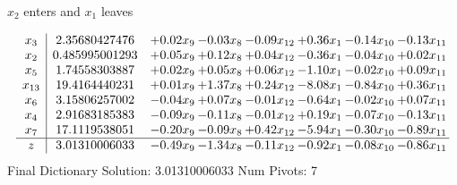 \documentclass[9pt]{article}
\begin{document}
 $ x_{2} $ enters and $ x_{1} $ leaves 

 \[\begin{array}{c| c c@{\hskip 2pt} c@{\hskip 2pt} c@{\hskip 2pt} c@{\hskip 2pt} c@{\hskip 2pt} c@{\hskip 2pt} }
 x_{3}   &  2.35680427476 & +  0.02 x_{9} & -0.03 x_{8} & -0.09 x_{12} & +  0.36 x_{1} & -0.14 x_{10} & -0.13 x_{11}\\
 x_{2}   &  0.485995001293 & +  0.05 x_{9} & +  0.12 x_{8} & +  0.04 x_{12} & -0.36 x_{1} & -0.04 x_{10} & +  0.02 x_{11}\\
 x_{5}   &  1.74558303887 & +  0.02 x_{9} & +  0.05 x_{8} & +  0.06 x_{12} & -1.10 x_{1} & -0.02 x_{10} & +  0.09 x_{11}\\
 x_{13}   &  19.4164440231 & +  0.01 x_{9} & +  1.37 x_{8} & +  0.24 x_{12} & -8.08 x_{1} & -0.84 x_{10} & +  0.36 x_{11}\\
 x_{6}   &  3.15806257002 & -0.04 x_{9} & +  0.07 x_{8} & -0.01 x_{12} & -0.64 x_{1} & -0.02 x_{10} & +  0.07 x_{11}\\
 x_{4}   &  2.91683185383 & -0.09 x_{9} & -0.11 x_{8} & -0.01 x_{12} & +  0.19 x_{1} & -0.07 x_{10} & -0.13 x_{11}\\
 x_{7}   &  17.1119538051 & -0.20 x_{9} & -0.09 x_{8} & +  0.42 x_{12} & -5.94 x_{1} & -0.30 x_{10} & -0.89 x_{11}\\
\hline
z    &  3.01310006033 & -0.49 x_{9} & -1.34 x_{8} & -0.11 x_{12} & -0.92 x_{1} & -0.08 x_{10} & -0.86 x_{11}\\
\end{array}\]
Final Dictionary
Solution:  3.01310006033
Num Pivots:  7
\end{document}
